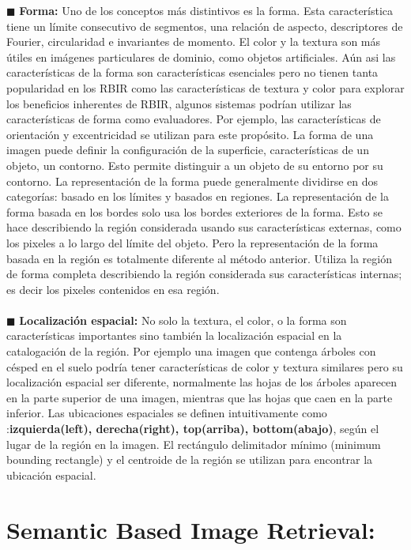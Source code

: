 \documentclass{llncs}
\begin{document}
$\blacksquare$  \textbf{Forma:}
Uno de los conceptos m\'as distintivos es la forma. Esta caracter\'istica tiene un l\'imite consecutivo de segmentos, una relaci\'on 
de aspecto, descriptores de Fourier, circularidad e invariantes de momento. El color y la textura son m\'as \'utiles en im\'agenes 
particulares de dominio, como objetos artificiales. A\'un asi las caracter\'isticas de la forma son caracter\'isticas esenciales 
pero no tienen tanta popularidad en los RBIR como las caracter\'isticas de textura y color para explorar los beneficios inherentes de RBIR,
algunos sistemas podrían utilizar las características de forma como evaluadores. Por ejemplo, las características de orientación 
y excentricidad se utilizan para este propósito. La forma de una imagen puede definir la configuraci\'on de la superficie, caracter\'isticas
de un objeto, un contorno. Esto permite distinguir a un objeto de su entorno por su contorno. La representaci\'on de la forma puede 
generalmente dividirse en dos categor\'ias: basado en los l\'imites y basados en regiones. La representaci\'on de la forma basada en los 
bordes solo usa los bordes exteriores de la forma. Esto se hace describiendo la regi\'on considerada usando sus caracter\'isticas externas,
como los pixeles a lo largo del l\'imite del objeto. Pero la representaci\'on de la forma basada en la regi\'on es totalmente diferente 
al m\'etodo anterior. Utiliza la regi\'on de forma completa describiendo la regi\'on considerada sus caracter\'isticas internas; es 
decir los pixeles contenidos en esa regi\'on.\\
\\
$\blacksquare$  \textbf{Localizaci\'on espacial:}
No solo la textura, el color, o la forma son caracter\'isticas importantes sino tambi\'en la localizaci\'on espacial en la catalogaci\'on 
de la regi\'on. Por ejemplo una imagen que contenga \'arboles con c\'esped en el suelo podr\'ia tener caracter\'isticas de color y textura 
similares pero su localizaci\'on espacial ser diferente, normalmente las hojas de los \'arboles aparecen en la parte superior de una imagen,
mientras que las hojas que caen en la parte inferior. Las ubicaciones espaciales se definen intuitivamente como :\textbf{izquierda(left), derecha(right),
top(arriba), bottom(abajo)}, seg\'un el lugar de la regi\'on en la imagen. El rect\'angulo delimitador m\'inimo (minimum bounding rectangle) y 
el centroide de la regi\'on se utilizan para encontrar la ubicaci\'on espacial.     

\section{Semantic Based Image Retrieval:}
\end{document}
